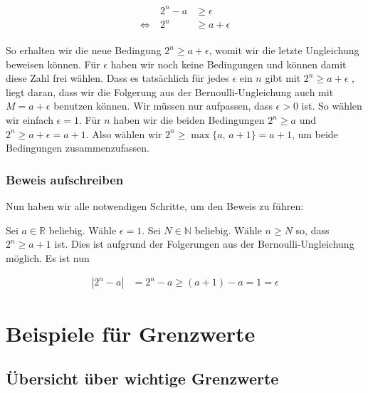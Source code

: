 \documentclass[fontsize=9pt,
               parskip=half-,
               DIV=14,
               listof=chapterentry,
               tocflat]{scrbook}
\begin{document}
\begin{align*}
{\begin{array}{rrl}&2^{n}-a&\geq \epsilon \\\Leftrightarrow \ &2^{n}&\geq a+\epsilon \end{array}}
\end{align*}

So erhalten wir die neue Bedingung $2^{n}\geq a+\epsilon $, womit wir die letzte Ungleichung beweisen können. Für $\epsilon $ haben wir noch keine Bedingungen und können damit diese Zahl frei wählen. Dass es tatsächlich für jedes $\epsilon $ ein $n$ gibt mit $2^{n}\geq a+\epsilon $ , liegt daran, dass wir die Folgerung aus der Bernoulli-Ungleichung auch mit $M=a+\epsilon $ benutzen können. Wir müssen nur aufpassen, dass $\epsilon >0$ ist. So wählen wir einfach $\epsilon =1$. Für $n$ haben wir die beiden Bedingungen $2^{n}\geq a$ und $2^{n}\geq a+\epsilon =a+1$. Also wählen wir $2^{n}\geq \max\{a,\,a+1\}=a+1$, um beide Bedingungen zusammenzufassen.

\subsection{Beweis aufschreiben}

Nun haben wir alle notwendigen Schritte, um den Beweis zu führen:

\begin{proof*}
Sei $a\in \mathbb {R} $ beliebig. Wähle $\epsilon =1$. Sei $N\in \mathbb {N} $ beliebig. Wähle $n\geq N$ so, dass $2^{n}\geq a+1$ ist. Dies ist aufgrund der Folgerungen aus der Bernoulli-Ungleichung möglich. Es ist nun

\begin{align*}
|2^{n}-a|&=2^{n}-a\geq (a+1)-a=1=\epsilon 
\end{align*}

\end{proof*}

\chapter{Beispiele für Grenzwerte}

\section{Übersicht über wichtige Grenzwerte}
\end{document}
